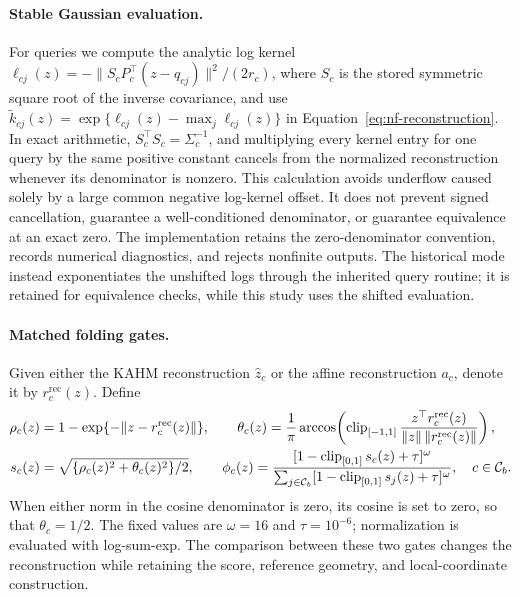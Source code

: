 \paragraph{Stable Gaussian evaluation.}
For queries we compute the analytic log kernel
$\ell_{cj}(z)=-\|S_cP_c^\top(z-q_{cj})\|^2/(2r_c)$, where $S_c$ is the
stored symmetric square root of the inverse covariance, and use
$\widetilde k_{cj}(z)=\exp\{\ell_{cj}(z)-\max_j\ell_{cj}(z)\}$ in
Equation~\eqref{eq:nf-reconstruction}.
In exact arithmetic, $S_c^\top S_c=\Sigma_c^{-1}$, and multiplying every
kernel entry for one query by the same positive constant cancels from the
normalized reconstruction whenever its denominator is nonzero.
This calculation avoids underflow caused solely by a large common negative
log-kernel offset.  It does not prevent signed cancellation, guarantee a
well-conditioned denominator, or guarantee equivalence at an exact zero.
The implementation retains the zero-denominator convention, records numerical
diagnostics, and rejects nonfinite outputs.  The historical mode instead
exponentiates the unshifted logs through the inherited query routine; it is
retained for equivalence checks, while this study uses the shifted evaluation.

\paragraph{Matched folding gates.}
Given either the KAHM reconstruction $\widehat z_c$ or the affine
reconstruction $a_c$, denote it by $r_c^{\mathrm{rec}}(z)$.  Define
\begin{align}
 \rho_c(z)&=1-\exp\{-\|z-r_c^{\mathrm{rec}}(z)\|\},\qquad
 \theta_c(z)=\frac1\pi\arccos\!\left(
 \operatorname{clip}_{[-1,1]}
 \frac{z^\top r_c^{\mathrm{rec}}(z)}{\|z\|\,\|r_c^{\mathrm{rec}}(z)\|}\right),
 \notag\\
 s_c(z)&=\sqrt{\{\rho_c(z)^2+\theta_c(z)^2\}/2},\qquad
 \phi_c(z)=\frac{[1-\operatorname{clip}_{[0,1]}s_c(z)+\tau]^\omega}
 {\sum_{j\in\mathcal C_b}[1-\operatorname{clip}_{[0,1]}s_j(z)+\tau]^\omega},
 \quad c\in\mathcal C_b.
 \label{eq:nf-folding-gates}
\end{align}
When either norm in the cosine denominator is zero, its cosine is set to
zero, so that $\theta_c=1/2$.  The fixed values are $\omega=16$ and
$\tau=10^{-6}$; normalization is evaluated with log-sum-exp.  The comparison
between these two gates changes the reconstruction while retaining the
score, reference geometry, and local-coordinate construction.

